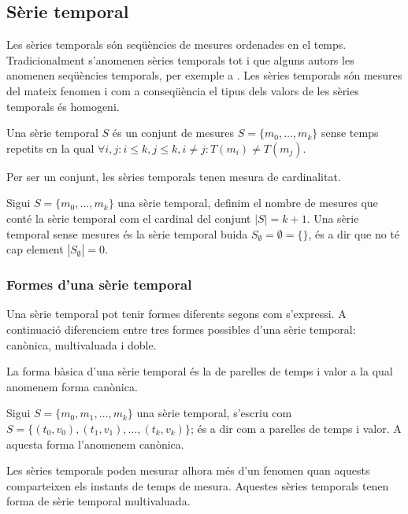 \subsection{Sèrie temporal}
\label{sec:model:serietemporal}

Les sèries temporals són seqüències de mesures ordenades en el temps.
Tradicionalment s'anomenen sèries temporals tot i que alguns autors les anomenen
seqüències temporals, per exemple a \cite{last:hetland}.  Les sèries
temporals són mesures del mateix fenomen i com a conseqüència el tipus
dels valors de les sèries temporals és homogeni.


\begin{definition}
  \label{def:serie_temporal}
  Una sèrie temporal $S$ és un conjunt de mesures
  $S=\{m_0,\ldots,m_k\}$ sense temps repetits en la qual
  $\forall i,j: i\leq k, j\leq k, i\neq j : T(m_i)\neq T(m_j)$.
\end{definition}

Per ser un conjunt, les sèries temporals tenen mesura de cardinalitat.
\begin{definition}[Cardinal]
  Sigui $S=\{m_0,\ldots,m_k\}$ una sèrie temporal, definim el nombre
  de mesures que conté la sèrie temporal com el cardinal del conjunt
  $|S|=k+1$. Una sèrie temporal sense mesures és la sèrie temporal
  buida $S_\emptyset= \emptyset = \{\}$, és a dir que no té cap element
  $|S_\emptyset|=0$.
\end{definition}



 
\subsubsection{Formes d'una sèrie temporal}

Una sèrie temporal pot tenir formes diferents segons com s'expressi.
A continuació diferenciem entre tres formes possibles d'una sèrie
temporal: canònica, multivaluada i doble.


La forma bàsica d'una sèrie temporal és la de parelles de temps i
valor a la qual anomenem forma canònica.
\begin{definition}
  Sigui $S = \{ m_0, m_1 , \dotsc, m_k \}$ una sèrie temporal,
  s'escriu com $S =  \{
  (t_0,v_0), (t_1,v_1), \dotsc, (t_k,v_k)\}$; és
  a dir com a parelles de temps i valor. A aquesta
  forma l'anomenem canònica.
\end{definition}


Les sèries temporals poden mesurar alhora més d'un fenomen quan
aquests comparteixen els instants de temps de mesura. Aquestes sèries
temporals tenen forma de sèrie temporal multivaluada.


